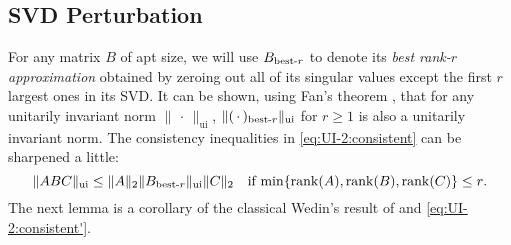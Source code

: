\documentclass[11pt]{article}
\DeclareMathOperator{\rank}{rank}
\DeclareMathOperator{\UI}{ui}
\def\bestr{\mbox{\scriptsize\rm best-$r$}}
\theoremstyle{definition}
\numberwithin{equation}{section}
\numberwithin{figure}{section}
\numberwithin{table}{section}
\begin{document}
\subsection{SVD Perturbation}
For any matrix $B$ of apt size, we will use $B_{\bestr}$ to denote its {\em best rank-$r$ approximation\/}
obtained by zeroing out all of its singular values except the first $r$ largest ones in its SVD. It can be shown,
using Fan's theorem \cite[p.86]{stsu:1990}, that
for any unitarily invariant norm $\|\,\cdot\,\|_{\UI}$, $\|(\,\cdot\,)_{\bestr}\|_{\UI}$ for $r\ge 1$ is also
a unitarily invariant norm. The consistency inequalities in \eqref{eq:UI-2:consistent} can be sharpened a little:
\begin{equation}\label{eq:UI-2:consistent'}
\|ABC\|_{\UI}\le\| A\|_2\|B_{\bestr}\|_{\UI}\|C\|_2\quad\mbox{if $\min\{\rank(A),\rank(B),\rank(C)\}\le r$}.
\end{equation}
The next lemma is a corollary of the classical Wedin's result of
\cite[(3.1)]{wedi:1972} and \eqref{eq:UI-2:consistent'}.
\end{document}
